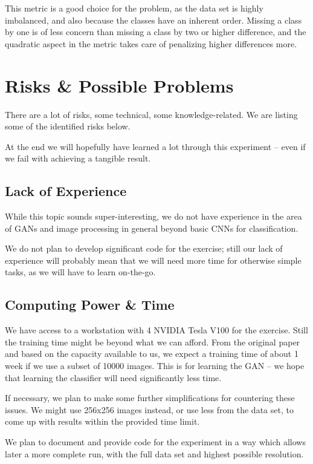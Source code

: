 \documentclass[sigconf,nonacm]{acmart}
\begin{document}
This metric is a good choice for the problem, as the data set
is highly imbalanced, and also because the classes have an
inherent order.
Missing a class by one is of less concern than missing a class
by two or higher difference, and the quadratic
aspect in the metric takes care of penalizing higher differences
more.

\section{Risks \& Possible Problems}

There are a lot of risks, some technical, some knowledge-related.
We are listing some of the identified risks below.

At the end we will hopefully have learned a lot through this
experiment -- even if we fail with achieving a tangible result.

\subsection{Lack of Experience}

While this topic sounds super-interesting, we do not have
experience in the area of GANs and image processing in general
beyond basic CNNs for classification.

We do not plan to develop significant code for the exercise; still
our lack of experience will probably mean that we will need
more time for otherwise simple tasks, as we will have to
learn on-the-go.

\subsection{Computing Power \& Time}

We have access to a workstation with 4 NVIDIA Tesla V100 for
the exercise.
Still the training time might be beyond what we can afford.
From the original paper and based on the capacity available
to us, we expect a training time of about 1 week if we use
a subset of \SI{10000}{} images.
This is for learning the GAN -- we hope that learning the
classifier will need significantly less time.

If necessary, we plan to make some further simplifications for
countering these issues.
We might use 256x256 images instead, or use less from the data set,
to come up with results within the provided time limit.

We plan to document and provide code for the experiment in a way
which allows later a more complete run, with the full data set
and highest possible resolution.
\end{document}
